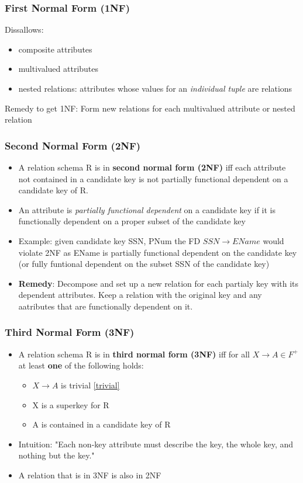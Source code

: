 \subsubsection{First Normal Form (1NF)}
Dissallows: \begin{itemize}
    \item composite attributes
    \item multivalued attributes 
    \item nested relations: attributes whose values for an \textit{individual tuple} are relations 
\end{itemize}
Remedy to get 1NF: Form new relations for each multivalued attribute or nested relation

\subsubsection{Second Normal Form (2NF)}
\begin{itemize}
    \item A relation schema R is in \textbf{second normal form (2NF)} iff each attribute not contained in a candidate key is not partially functional dependent on a candidate key of R. 
    \item An attribute is \textit{partially functional dependent} on a candidate key if it is functionally dependent on a proper subset of the candidate key
    \item Example: given candidate key SSN, PNum the FD $SSN \rightarrow EName$ would violate 2NF as EName is partially functional dependent on the candidate key (or fully funtional dependent on the subset SSN of the candidate key)
    \item \textbf{Remedy}: Decompose and set up a new relation for each partialy key with its dependent attributes. Keep a relation with the original key and any aatributes that are functionally dependent on it. 
\end{itemize}

\subsubsection{Third Normal Form (3NF)}

\begin{itemize}
    \item A relation schema R is in \textbf{third normal form (3NF)} iff for all $X\rightarrow A \in F^+$ at least \textbf{one} of the following holds:
    \begin{itemize}
        \item $X\rightarrow A$ is trivial \ref{trivial}
        \item X is a superkey for R
        \item A is contained in a candidate key of R
    \end{itemize}
    \item Intuition: "Each non-key attribute must describe the key, the whole key, and nothing but the key."
    \item A relation that is in 3NF is also in 2NF 
\end{itemize}


